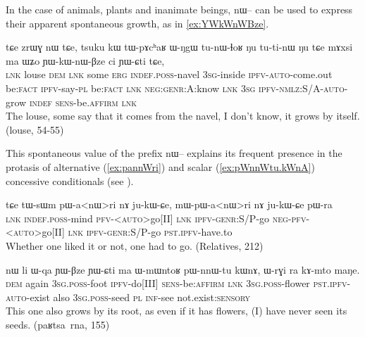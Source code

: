 \documentclass[oldfontcommands,oneside,a4paper,11pt]{article}
\newcommand{\ipa}[1]{{\phon \mbox{#1}}} %
\begin{document}
In the case of animals, plants and inanimate beings, \ipa{nɯ--} can be used to express  their apparent spontaneous growth, as in \ref{ex:YWkWnWBze}.
\begin{exe}
\ex \label{ex:YWkWnWBze}
\gll 
\ipa{tɕe} 	\ipa{zrɯɣ} 	\ipa{nɯ} 	\ipa{tɕe,} 	\ipa{tsuku} 	\ipa{kɯ} 	\ipa{tɯ-pɤcʰaʁ} 	\ipa{ɯ-ŋgɯ} 	\ipa{tu-nɯ-ɬoʁ} 	\ipa{ŋu} 	\ipa{tu-ti-nɯ} 	\ipa{ŋu} 	\ipa{tɕe} 	\ipa{mɤxsi} 	\ipa{ma} 	\ipa{ɯʑo} 	\ipa{ɲɯ-kɯ-nɯ-βze} 	\ipa{ci} 	\ipa{ɲɯ-ɕti} 	\ipa{tɕe,} 	\\
\textsc{lnk} louse \textsc{dem} \textsc{lnk} some \textsc{erg} \textsc{indef.poss}-navel \textsc{3sg}-inside \textsc{ipfv-auto}-come.out be:\textsc{fact} \textsc{ipfv}-say-\textsc{pl}  be:\textsc{fact} \textsc{lnk} \textsc{neg:genr:}A:know \textsc{lnk} \textsc{3sg} \textsc{ipfv-nmlz:S/A-auto}-grow \textsc{indef} \textsc{sens}-be.\textsc{affirm} \textsc{lnk} \\
\glt The louse, some say that it comes from the navel, I don't know, it grows by itself. (louse, 54-55)
\end{exe}

This spontaneous value of the prefix \ipa{nɯ--}  explains its frequent presence in the protasis of alternative  (\ref{ex:pannWri}) and scalar (\ref{ex:pWnnWtu.kWnA})  concessive conditionals (see \citealt{jacques14linking}).

\begin{exe}
\ex  \label{ex:pannWri}
\gll
\ipa{tɕe}  	\ipa{tɯ-sɯm}  	\ipa{pɯ-a<nɯ>ri}  	\ipa{nɤ}  	\ipa{ju-kɯ-ɕe,}  \ipa{mɯ-pɯ-a<nɯ>ri}  	\ipa{nɤ}  	\ipa{ju-kɯ-ɕe}  	\ipa{pɯ-ra}  \\
\textsc{lnk} \textsc{indef.poss}-mind  \textsc{pfv-<auto>}go[II] \textsc{lnk} \textsc{ipfv-genr}:S/P-go \textsc{neg-pfv-<auto>}go[II] \textsc{lnk} \textsc{ipfv-genr}:S/P-go \textsc{pst.ipfv}-have.to \\
\glt Whether one liked it or not, one had to go. (Relatives, 212)
\end{exe}


 \begin{exe}
\ex  \label{ex:pWnnWtu.kWnA}
\gll
\ipa{nɯ}    	\ipa{li}    	\ipa{ɯ-qa}    	\ipa{ɲɯ-βze}    	\ipa{ɲɯ-ɕti}    	\ipa{ma}    	\ipa{ɯ-mɯntoʁ}    	\ipa{pɯ-nnɯ-tu}    	\ipa{kɯnɤ,}    	\ipa{ɯ-rɣi}    	\ipa{ra}    	\ipa{kɤ-mto}    	\ipa{maŋe.}    \\
\textsc{dem} again \textsc{3sg.poss}-foot \textsc{ipfv}-do[III] \textsc{sens}-be:\textsc{affirm} \textsc{lnk} \textsc{3sg.poss}-flower \textsc{pst.ipfv-auto}-exist also \textsc{3sg.poss}-seed \textsc{pl} \textsc{inf}-see not.exist:\textsc{sensory} \\
\glt This one also grows by its root, as even if it has flowers, (I) have never seen its seeds. (\ipa{paʁtsa rna}, 155)
\end{exe}
\end{document}
